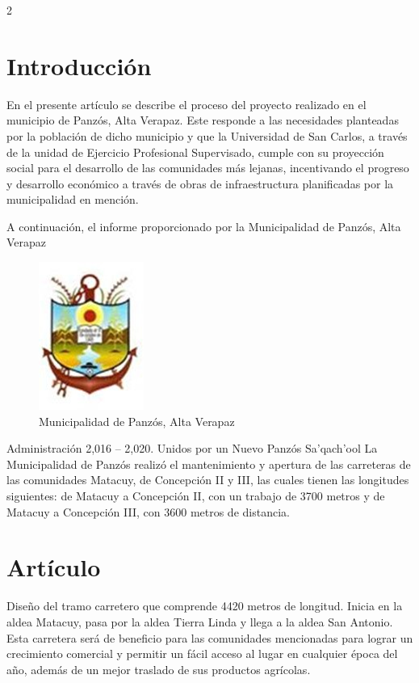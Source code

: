 \documentclass[12pt,spanish,Letterpaper,openany]{book}
\newcommand{\spacetwominus}{\vspace{-2mm}}
\begin{document}
\begin {multicols*}{2}

\hypertarget{introduccion-1}{%
\section{Introducción}\label{introduccion-1}}

En el presente artículo se describe el proceso del proyecto realizado en el municipio de Panzós, Alta Verapaz. Este responde a las necesidades planteadas por la población de dicho municipio y que la Universidad de San Carlos, a través de la unidad de Ejercicio Profesional Supervisado, cumple con su proyección social para el desarrollo de las comunidades más lejanas, incentivando el progreso y desarrollo económico a través de obras de infraestructura planificadas por la municipalidad en mención.

A continuación, el informe proporcionado por la Municipalidad de Panzós, Alta Verapaz

\begin{figure}[H]

{\centering \includegraphics[width=0.14\linewidth]{images/image01_mgarcia} 

}

\caption{Municipalidad de Panzós, Alta Verapaz}\label{fig:unnamed-chunk-15}
\end{figure}

\spacetwominus
\spacetwominus
\spacetwominus

Administración 2,016 -- 2,020. Unidos por un Nuevo Panzós Sa'qach'ool La Municipalidad de Panzós realizó el mantenimiento y apertura de las carreteras de las comunidades Matacuy, de Concepción II y III, las cuales tienen las longitudes siguientes: de Matacuy a Concepción II, con un trabajo de 3700 metros y de Matacuy a Concepción III, con 3600 metros de distancia.

\hypertarget{articulo}{%
\section{Artículo}\label{articulo}}

\spacetwominus

Diseño del tramo carretero que comprende 4420 metros de longitud. Inicia en la aldea Matacuy, pasa por la aldea Tierra Linda y llega a la aldea San Antonio. Esta carretera será de beneficio para las comunidades mencionadas para lograr un crecimiento comercial y permitir un fácil acceso al lugar en cualquier época del año, además de un mejor traslado de sus productos agrícolas.


\end{multicols*}
\end{document}
